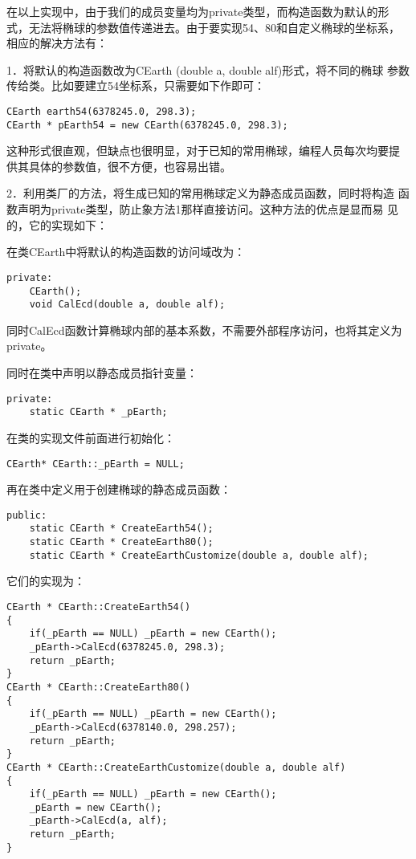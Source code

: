 在以上实现中，由于我们的成员变量均为private类型，而构造函数为默认的形
式，无法将椭球的参数值传递进去。由于要实现54、80和自定义椭球的坐标系，
相应的解决方法有：

1．将默认的构造函数改为CEarth (double a, double alf)形式，将不同的椭球
参数传给类。比如要建立54坐标系，只需要如下作即可：
\begin{verbatim}
CEarth earth54(6378245.0, 298.3);
CEarth * pEarth54 = new CEarth(6378245.0, 298.3);
\end{verbatim}

这种形式很直观，但缺点也很明显，对于已知的常用椭球，编程人员每次均要提
供其具体的参数值，很不方便，也容易出错。

2．利用类厂的方法，将生成已知的常用椭球定义为静态成员函数，同时将构造
函数声明为private类型，防止象方法1那样直接访问。这种方法的优点是显而易
见的，它的实现如下：

在类CEarth中将默认的构造函数的访问域改为：
\begin{verbatim}
private:
    CEarth();
    void CalEcd(double a, double alf);
\end{verbatim}

同时CalEcd函数计算椭球内部的基本系数，不需要外部程序访问，也将其定义为
private。

同时在类中声明以静态成员指针变量：
\begin{verbatim}
private:
    static CEarth * _pEarth;
\end{verbatim}
在类的实现文件前面进行初始化：
\begin{verbatim}
CEarth* CEarth::_pEarth = NULL;
\end{verbatim}

再在类中定义用于创建椭球的静态成员函数：
\begin{verbatim}
public:
    static CEarth * CreateEarth54();
    static CEarth * CreateEarth80();
    static CEarth * CreateEarthCustomize(double a, double alf);
\end{verbatim}

它们的实现为：
\begin{verbatim}
CEarth * CEarth::CreateEarth54()
{
    if(_pEarth == NULL) _pEarth = new CEarth();
    _pEarth->CalEcd(6378245.0, 298.3);
    return _pEarth;
}
CEarth * CEarth::CreateEarth80()
{
    if(_pEarth == NULL) _pEarth = new CEarth();
    _pEarth->CalEcd(6378140.0, 298.257);
    return _pEarth;
}
CEarth * CEarth::CreateEarthCustomize(double a, double alf)
{
    if(_pEarth == NULL) _pEarth = new CEarth();
    _pEarth = new CEarth();
    _pEarth->CalEcd(a, alf);
    return _pEarth;
}
\end{verbatim}

